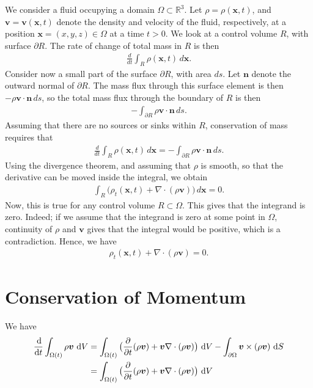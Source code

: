 \documentclass[12pt]{article}
\begin{document}
We consider a fluid occupying a domain $\Omega \subset \mathbb{R}^3$. Let $\rho = \rho(\bm{x}, t)$, and
$\bm{v} = \bm{v}(\bm{x},t)$ denote the density and velocity of the fluid, respectively, at a position
$\bm{x} = (x,y,z) \in \Omega$ at a time $t > 0$. We look at a control volume $R$, with surface $\partial R$.
The rate of change of total mass in $R$ is then
\begin{align}
    \frac{d}{d t}\int_R \rho(\bm{x},t) \, d \bm{x}.
\end{align}
Consider now a small part of the surface $\partial R$, with area $ds$. Let $\bm{n}$ denote the outward normal
of $\partial R$. The mass flux through this surface element is then $-\rho \bm{v} \cdot \bm{n} \, ds$, so the
total mass flux through the boundary of $R$ is then
\begin{align}
    -\int_{\partial R}\rho \bm{v} \cdot \bm{n} \, ds.
\end{align}
Assuming that there are no sources or sinks within $R$, conservation of mass requires that
\begin{align}
    \frac{d}{d t}\int_R \rho(\bm{x},t) \, d \bm{x}
                            = -\int_{\partial R}\rho \bm{v} \cdot \bm{n} \, ds.
\end{align}
Using the divergence theorem, and assuming that $\rho$ is smooth, so that the derivative can be moved inside
the integral, we obtain
\begin{align}
    \int_R \big(\rho_t(\bm{x},t) + \nabla \cdot (\rho \bm{v}) \big) \, d \bm{x} = 0.
\end{align}
Now, this is true for any control volume $R \subset \Omega$. This gives that the integrand is zero. Indeed;
if we assume that the integrand is zero at some point in $\Omega$, continuity of $\rho$ and $\bm{v}$
gives that the integral would be positive, which is a contradiction. Hence, we have
\begin{align}
    \rho_t(\bm{x},t) + \nabla \cdot (\rho \bm{v}) = 0.
\end{align}

\section{Conservation of Momentum}

We have
\begin{align}
	\begin{aligned}
	    \frac{\operatorname{d}\!}{\operatorname{d}\! t} \int_{\Omega(t)} \rho \bm{v} \, \operatorname{d}\! V 
	        & = \int_{\Omega(t)} \big(\frac{\partial}{\partial t}(\rho \bm{v})
	                + \bm{v} \nabla \cdot (\rho \bm{v}) \big) \, \operatorname{d}\! V
	                - \int_{\partial \Omega} \bm{v} \times (\rho \bm{v}) \, \operatorname{d}\! S \\
	        & = \int_{\Omega(t)} \big(\frac{\partial}{\partial t}(\rho \bm{v})
	                + \bm{v} \nabla \cdot (\rho \bm{v}) \big) \, \operatorname{d}\! V                
	\end{aligned}
\end{align}
\end{document}
